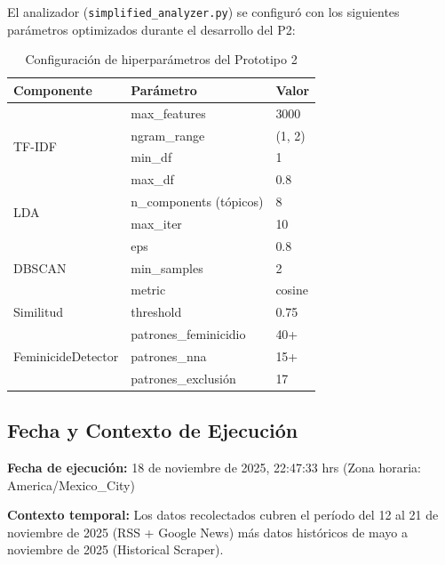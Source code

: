 El analizador (\texttt{simplified\_analyzer.py}) se configuró con los siguientes parámetros optimizados durante el desarrollo del P2:

\begin{table}[h]
\centering
\caption{Configuración de hiperparámetros del Prototipo 2}
\begin{tabular}{|l|l|l|}
\hline
\textbf{Componente} & \textbf{Parámetro} & \textbf{Valor} \\ \hline
\multirow{4}{*}{TF-IDF} & max\_features & 3000 \\ \cline{2-3}
 & ngram\_range & (1, 2) \\ \cline{2-3}
 & min\_df & 1 \\ \cline{2-3}
 & max\_df & 0.8 \\ \hline
\multirow{2}{*}{LDA} & n\_components (tópicos) & 8 \\ \cline{2-3}
 & max\_iter & 10 \\ \hline
\multirow{3}{*}{DBSCAN} & eps & 0.8 \\ \cline{2-3}
 & min\_samples & 2 \\ \cline{2-3}
 & metric & cosine \\ \hline
Similitud & threshold & 0.75 \\ \hline
\multirow{3}{*}{FeminicideDetector} & patrones\_feminicidio & 40+ \\ \cline{2-3}
 & patrones\_nna & 15+ \\ \cline{2-3}
 & patrones\_exclusión & 17 \\ \hline
\end{tabular}
\end{table}

\subsection{Fecha y Contexto de Ejecución}
\label{subsec:fecha_ejecucion}

\textbf{Fecha de ejecución:} 18 de noviembre de 2025, 22:47:33 hrs (Zona horaria: America/Mexico\_City)

\textbf{Contexto temporal:} Los datos recolectados cubren el período del 12 al 21 de noviembre de 2025 (RSS + Google News) más datos históricos de mayo a noviembre de 2025 (Historical Scraper).

